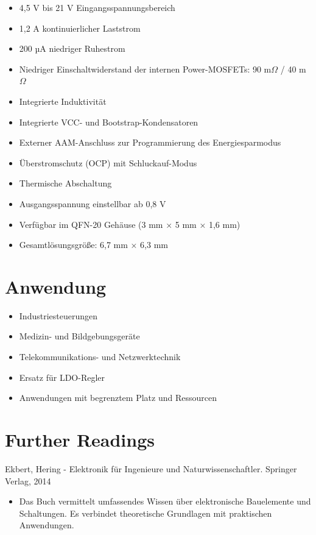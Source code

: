 \begin{itemize}
	\item 4,5 V bis 21 V Eingangsspannungsbereich
	
	\item 1,2 A kontinuierlicher Laststrom
	
	\item 200 µA niedriger Ruhestrom
	
	\item Niedriger Einschaltwiderstand der internen Power-MOSFETs: 90 m$\Omega$ / 40 m$\Omega$
	
	\item Integrierte Induktivität 
	
	\item Integrierte VCC- und Bootstrap-Kondensatoren
	
	\item Externer AAM-Anschluss zur Programmierung des Energiesparmodus
	
	\item Überstromschutz (OCP) mit Schluckauf-Modus
	
	\item Thermische Abschaltung
	
	\item Ausgangsspannung einstellbar ab 0,8 V 
	
	\item Verfügbar im QFN-20 Gehäuse (3 mm × 5 mm × 1,6 mm)
	
	\item Gesamtlösungsgröße: 6,7 mm × 6,3 mm
	
\end{itemize}
\cite{MPS:2015}

\section{Anwendung}

\begin{itemize}
	\item Industriesteuerungen
	
	\item Medizin- und Bildgebungsgeräte
	
	\item Telekommunikations- und Netzwerktechnik
	
	\item Ersatz für LDO-Regler
	
	\item Anwendungen mit begrenztem Platz und Ressourcen
\end{itemize}
\cite{MPS:2015}


\section{Further Readings}
Ekbert, Hering - Elektronik für Ingenieure und Naturwissenschaftler. Springer Verlag, 2014 \cite{Ekbert:2014}
	\begin{itemize}
		\item Das Buch vermittelt umfassendes Wissen über elektronische Bauelemente und Schaltungen. Es verbindet theoretische Grundlagen mit praktischen Anwendungen.
	\end{itemize} 

